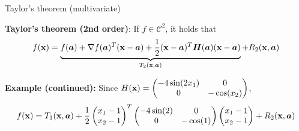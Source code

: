 \documentclass[11pt,compress,t,notes=noshow, xcolor=table]{beamer}
\begin{document}
\begin{vbframe}{Taylor's theorem (multivariate)}
\vspace*{-1cm}

\begin{kframe}
    \textbf{Taylor's theorem (2nd order)}: If $f \in \mathcal{C}^2$, it holds that
    \begin{equation*}
        f(\mathbf{x}) = \underbrace{f(\bm{a}) + \nabla f(\bm{a})^T (\mathbf{x} - \bm{a}) + \frac{1}{2}(\mathbf{x} - \bm{a})^T\bm{H}(\bm{a})(\mathbf{x} - \bm{a})}_{T_2(\mathbf{x}, \bm{a})} + R_2(\mathbf{x},\bm{a})
\end{equation*}
\end{kframe}

\begin{footnotesize}
    \textbf{Example (continued):} Since $H(\mathbf{x}) = \begin{pmatrix} -4 \sin(2x_1) & 0 \\ 0 & -\cos(x_2) \end{pmatrix}$,
    \begin{equation*}
        f(\mathbf{x}) = T_1(\mathbf{x}, \bm{a}) + \frac{1}{2}\begin{pmatrix}x_1 - 1 \\ x_2 - 1 \end{pmatrix}^T \begin{pmatrix} -4 \sin(2) & 0 \\ 0 & -\cos(1) \end{pmatrix} \begin{pmatrix}x_1 - 1 \\ x_2 - 1 \end{pmatrix} + R_2(\mathbf{x}, \bm{a})
    \end{equation*}
\end{footnotesize}

\vspace*{-0.5\baselineskip}


\end{vbframe}
\end{document}
